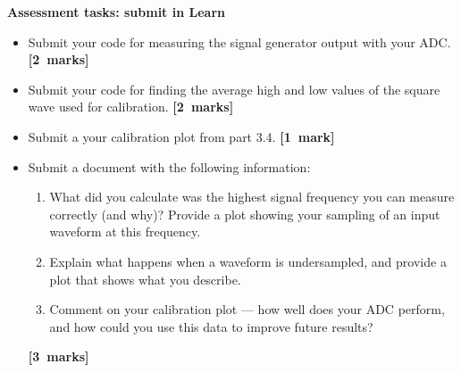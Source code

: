 \begin{enumerate}



 

\end{enumerate}

\newpage
{\bf Assessment tasks: submit in Learn}

\begin{itemize}

\item Submit your code for measuring the signal generator output with your ADC. \\
\null\hfill {\bf[2~marks]}

\item Submit your code for finding the average high and low values of the square wave used for calibration.
\null\hfill {\bf[2~marks]}

\item Submit a your calibration plot from part 3.4.
\null\hfill {\bf[1~mark]}

\item Submit a document with the following information:
\begin{enumerate}
\item What did you calculate was the highest signal frequency you can measure correctly (and why)? Provide a plot showing your sampling of an input waveform at this frequency.
\item Explain what happens when a waveform is undersampled, and provide a plot that shows what you describe.
\item Comment on your calibration plot --- how well does your ADC perform, and how could you use this data to improve future results?
\end{enumerate}
\hfill {\bf[3~marks]}

\end{itemize}

